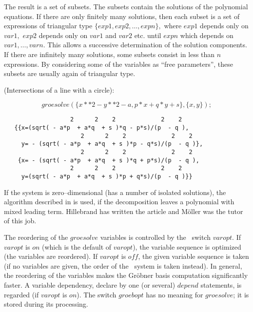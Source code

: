 The result is a set of subsets. The subsets contain the solutions of the
polynomial equations. If there are only finitely many solutions,
then each subset is a set of expressions of triangular type
$\{exp1, exp2,\ldots , expn\},$ where $exp1$ depends only on
$var1,$ $exp2$ depends only on $var1$ and $var2$ etc. until $expn$ which
depends on $var1,\ldots,varn.$ This allows a successive determination of
the solution components. If there are infinitely many solutions,
some subsets consist in less than $n$ expressions. By considering some
of the variables as ``free parameters'',  these subsets are usually
again of triangular type.

\example (Intersections of a line with a circle):

\[ groesolve(\{x**2 - y**2 - a, p*x+q*y+s\},\{x,y\}); \]

\begin{verbatim}
                   2      2    2             2    2
   {{x=(sqrt( - a*p  + a*q  + s )*q - p*s)/(p  - q ),
                      2      2    2             2    2
     y= - (sqrt( - a*p  + a*q  + s )*p - q*s)/(p  - q )},
                      2      2    2             2    2
    {x= - (sqrt( - a*p  + a*q  + s )*q + p*s)/(p  - q ),
                   2      2    2             2    2
     y=(sqrt( - a*p  + a*q  + s )*p + q*s)/(p  - q )}}
\end{verbatim}

If the system is zero--dimensional (has a number of isolated solutions),
the algorithm described in \cite{Hillebrand:99} is used, if the decomposition
leaves a polynomial with mixed leading term. Hillebrand has written the
article and M\"oller was the tutor of this job.

The reordering of the $groesolve$ variables is controlled by the
\REDUCE \ switch $varopt$. If $varopt$ is $on$ (which is the default
of $varopt$), the variable sequence is optimized (the variables are reordered).
If $varopt$ is $off$, the given variable sequence is taken (if no variables
are given, the order of the \REDUCE \ system is taken instead). In general, the
reordering of the variables makes the Gr\"obner basis computation
significantly faster.
A variable dependency, declare by one (or several) $depend$ statements,
is regarded (if $varopt$ is $on$). The switch $groebopt$ has no meaning
for $groesolve$; it is stored during its processing.

